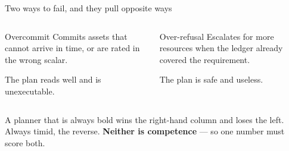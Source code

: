 \documentclass[aspectratio=169,11pt]{beamer}
\begin{document}
\begin{frame}{Two ways to fail, and they pull opposite ways}

\begin{columns}[t]
\begin{block}{Overcommit}
Commits assets that cannot arrive in time, or are rated in the wrong scalar.

\medskip
\small The plan reads well and is unexecutable.
\end{block}

\begin{block}{Over-refusal}
Escalates for more resources when the ledger already covered the requirement.

\medskip
\small The plan is safe and useless.
\end{block}
\end{columns}

\vfill
\begin{center}
\small
A planner that is always bold wins the right-hand column and loses the left.\\
Always timid, the reverse. \textbf{Neither is competence} --- so one number must score
both.
\end{center}

\end{frame}

\end{document}
